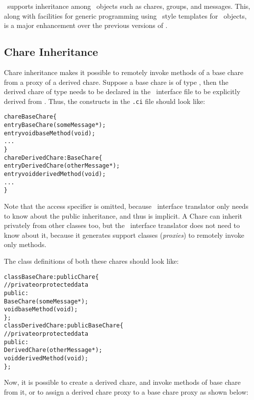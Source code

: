 \charmpp\ supports inheritance among \charmpp\ objects such as
chares, groups, and messages. This, along with facilities for generic
programming using \CC\ style templates for \charmpp\ objects, is a
major enhancement over the previous versions of \charmpp.

\subsection{Chare Inheritance}


Chare inheritance makes it possible to remotely invoke methods of a base
chare  from a proxy of a derived
chare. Suppose a base chare is of type 
, then the derived chare of type  needs to be
declared in the \charmpp\ interface file to be explicitly derived from
. Thus, the constructs in the \texttt{.ci} file should look like:

\begin{alltt}
  chare BaseChare \{
    entry BaseChare(someMessage *);
    entry void baseMethod(void);
    ...
  \}
  chare DerivedChare : BaseChare \{
    entry DerivedChare(otherMessage *);
    entry void derivedMethod(void);
    ...
  \}
\end{alltt}

Note that the access specifier  is omitted, because \charmpp\
interface translator only needs to know about the public inheritance,
and thus \kw{public} is implicit. A Chare can inherit privately from other
classes too, but the \charmpp\ interface translator does not need to know
about it, because it generates support classes ({\em proxies}) to remotely
invoke only \kw{public} methods.

The class definitions of both these chares should look like:

\begin{alltt}
  class BaseChare : public Chare \{
    // private or protected data
    public:
      BaseChare(someMessage *);
      void baseMethod(void);
  \};
  class DerivedChare : public BaseChare \{
    // private or protected data
    public:
      DerivedChare(otherMessage *);
      void derivedMethod(void);
  \};
\end{alltt}

Now, it is possible to create a derived chare, and invoke methods of base
chare from it, or to assign a derived chare proxy to a base chare proxy
as shown below:

